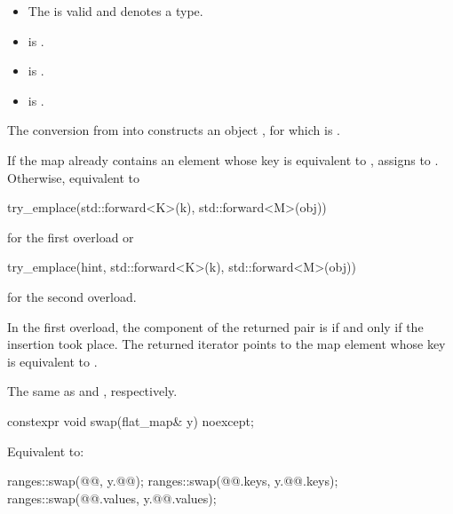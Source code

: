 \begin{itemdescr}
\pnum
\constraints
\begin{itemize}
\item
The  
is valid and denotes a type.
\item
{} is .
\item
{} is .
\item
{} is .
\end{itemize}

\pnum
\expects
The conversion from  into  constructs
an object , for which  is .

\pnum
\effects
If the map already contains an element 
whose key is equivalent to ,
assigns  to .
Otherwise, equivalent to
\begin{codeblock}
try_emplace(std::forward<K>(k), std::forward<M>(obj))
\end{codeblock}
for the first overload or
\begin{codeblock}
try_emplace(hint, std::forward<K>(k), std::forward<M>(obj))
\end{codeblock}
for the second overload.

\pnum
\returns
In the first overload,
the  component of the returned pair is 
if and only if the insertion took place.
The returned iterator points to the map element
whose key is equivalent to .

\pnum
\complexity
The same as  and , respectively.
\end{itemdescr}

%
\begin{itemdecl}
constexpr void swap(flat_map& y) noexcept;
\end{itemdecl}

\begin{itemdescr}
\pnum
\effects
Equivalent to:
\begin{codeblock}
ranges::swap(@@, y.@@);
ranges::swap(@@.keys, y.@@.keys);
ranges::swap(@@.values, y.@@.values);
\end{codeblock}
\end{itemdescr}

